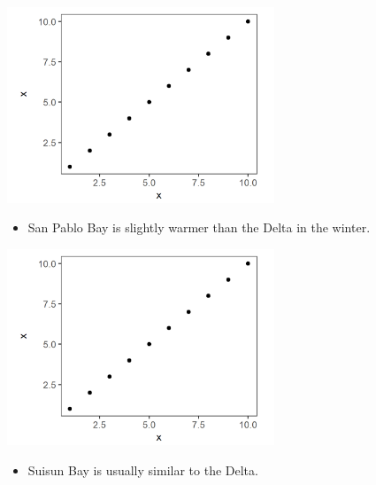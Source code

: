 \documentclass[]{article}\usepackage[]{graphicx}\usepackage[]{color}
\begin{document}
\begin{Row}
  \begin{Cell}{4}
    \begin{center}
      \includegraphics[width=8cm,align=m]{figures/temperature/placeholder_fig.png}
      \vspace{0.5cm}
      \begin{itemize}[leftmargin=1.5cm,rightmargin=1cm]
        \item San Pablo Bay is slightly warmer than the Delta in the winter.
      \end{itemize}
    \end{center}
  \end{Cell}

  \begin{Cell}{4}
    \begin{center}
      \includegraphics[width=8cm,align=m]{figures/temperature/placeholder_fig.png}
      \vspace{0.5cm}
      \begin{itemize}[leftmargin=1.5cm,rightmargin=1cm]
        \item Suisun Bay is usually similar to the Delta.
      \end{itemize}
    \end{center}
  \end{Cell}


\end{Row}
\end{document}
